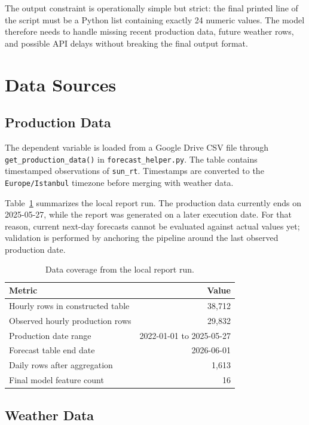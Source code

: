 \documentclass[11pt]{article}
\begin{document}
The output constraint is operationally simple but strict: the final printed line
of the script must be a Python list containing exactly 24 numeric values. The
model therefore needs to handle missing recent production data, future weather
rows, and possible API delays without breaking the final output format.

\section{Data Sources}

\subsection{Production Data}

The dependent variable is loaded from a Google Drive CSV file through
\texttt{get\_production\_data()} in \texttt{forecast\_helper.py}. The table
contains timestamped observations of \texttt{sun\_rt}. Timestamps are converted
to the \texttt{Europe/Istanbul} timezone before merging with weather data.

Table~\ref{tab:data_summary} summarizes the local report run. The production
data currently ends on 2025-05-27, while the report was generated on a later
execution date. For that reason, current next-day forecasts cannot be evaluated
against actual values yet; validation is performed by anchoring the pipeline
around the last observed production date.

\begin{table}[H]
\centering
\caption{Data coverage from the local report run.}
\label{tab:data_summary}
\begin{tabular}{lr}
\toprule
Metric & Value \\
\midrule
Hourly rows in constructed table & 38,712 \\
Observed hourly production rows & 29,832 \\
Production date range & 2022-01-01 to 2025-05-27 \\
Forecast table end date & 2026-06-01 \\
Daily rows after aggregation & 1,613 \\
Final model feature count & 16 \\
\bottomrule
\end{tabular}
\end{table}

\subsection{Weather Data}
\end{document}
